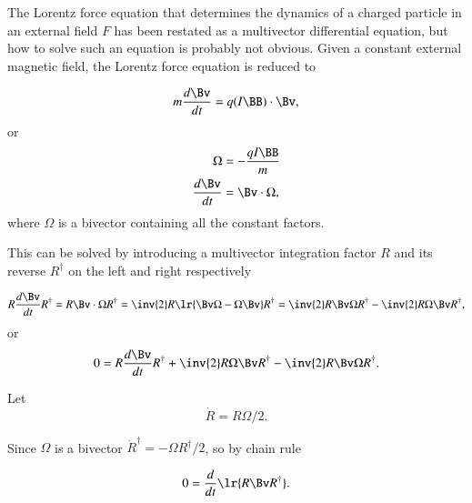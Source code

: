 %
%

The Lorentz force equation that determines the dynamics of a charged particle in an external field \( F \) has been restated as a multivector differential equation, but how to solve such an equation is probably not obvious.
Given a constant external magnetic field, the Lorentz force equation is reduced to

\begin{dmath}\label{eqn:lorentzForce_constantMagnetic:60}
m \frac{d\Bv}{dt} = q (I \BB) \cdot \Bv,
\end{dmath}
or
\begin{dmath}\label{eqn:lorentzForce_constantMagnetic:80}
\begin{aligned}
\Omega &= -\frac{q I \BB}{m} \\
\frac{d\Bv}{dt} &= \Bv \cdot \Omega,
\end{aligned}
\end{dmath}
where \( \Omega \) is a bivector containing all the constant factors.

This can be solved by introducing a multivector integration factor \( R \) and its reverse \( R^\dagger \) on the left and right respectively

\begin{dmath}\label{eqn:lorentzForce_constantMagnetic:100}
R \frac{d\Bv}{dt} R^\dagger
= R \Bv \cdot \Omega R^\dagger
= \inv{2} R \lr{ \Bv \Omega - \Omega \Bv} R^\dagger
= \inv{2} R \Bv \Omega R^\dagger - \inv{2} R \Omega \Bv R^\dagger,
\end{dmath}
or
\begin{dmath}\label{eqn:lorentzForce_constantMagnetic:120}
0 =
R \frac{d\Bv}{dt} R^\dagger
+ \inv{2} R \Omega \Bv R^\dagger
- \inv{2} R \Bv \Omega R^\dagger.
\end{dmath}

Let
\begin{dmath}\label{eqn:lorentzForce_constantMagnetic:140}
\dot{R} = R \Omega/2.
\end{dmath}

Since \( \Omega \) is a bivector \( \dot{R}^\dagger = -\Omega R^\dagger/2 \), so by chain rule

\begin{dmath}\label{eqn:lorentzForce_constantMagnetic:160}
0
=
\frac{d}{dt} \lr{
R \Bv R^\dagger
}.
\end{dmath}

